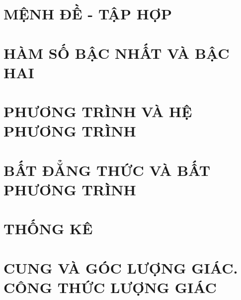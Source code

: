 \documentclass[12pt,a4paper,twoside]{book}
\theoremstyle{nonumberplain}
\begin{document}
\tableofcontents
\chapter{MỆNH ĐỀ - TẬP HỢP}
\setcounter{ex}{0}
	
	
	
	
	


\chapter{HÀM SỐ BẬC NHẤT VÀ BẬC HAI}
\setcounter{ex}{0}
	
	
	
	


\chapter{PHƯƠNG TRÌNH VÀ HỆ PHƯƠNG TRÌNH}
\setcounter{ex}{0}
	
	
	
	
	


\chapter{BẤT ĐẲNG THỨC VÀ BẤT PHƯƠNG TRÌNH}
\setcounter{ex}{0}
	
	
	
	
	
	


\chapter{THỐNG KÊ}
\setcounter{ex}{0}
	
	
	
	
	


\chapter{CUNG VÀ GÓC LƯỢNG GIÁC. CÔNG THỨC LƯỢNG GIÁC}
\setcounter{ex}{0}
	
	
	
	
\end{document}
